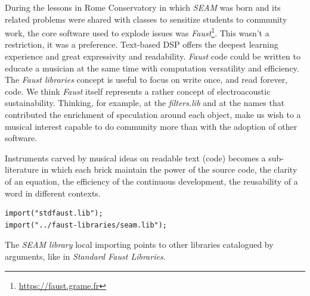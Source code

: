 \documentclass[twoside,a4paper]{article}
\begin{document}
During the lessons in Rome Conservatory in which \emph{SEAM} was born and its related problems were shared with classes to sensitize students to community work, the core software used to explode issues was \emph{Faust}\footnote{\url{https://faust.grame.fr}}. This wasn't a restriction, it was a preference. Text-based DSP offers the deepest learning experience and great expressivity and readability. \emph{Faust} code could be written to educate a musician at the same time with computation versatility and efficiency. The \emph{Faust libraries} concept is useful to focus on write once, and read forever, code. We think \emph{Faust} itself represents a rather concept of electroacoustic sustainability. Thinking, for example, at the \emph{filters.lib} and at the names that contributed the enrichment of speculation around each object, make us wish to a musical interest capable to do community more than with the adoption of other software.

Instruments carved by musical ideas on readable text (code) becomes a sub-literature in which each brick maintain the power of the source code, the clarity of an equation, the efficiency of the continuous development, the reusability of a word in different contexts. 

\begin{lstlisting}
import("stdfaust.lib");
import("../faust-libraries/seam.lib");
\end{lstlisting}

The \emph{SEAM library} local importing points to other libraries catalogued by arguments, like in \emph{Standard Faust Libraries}. 
\end{document}
